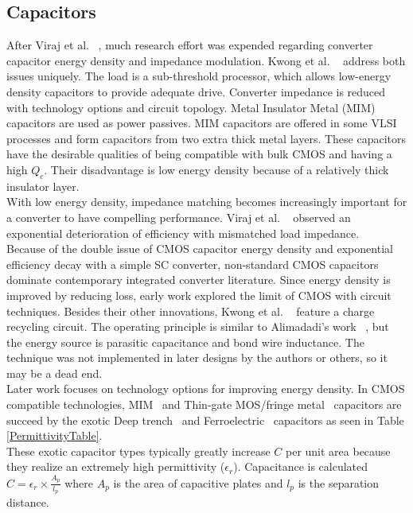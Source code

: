 \documentclass[letterpaper,twocolumn,10pt]{article}
\begin{document}
\subsection{Capacitors }After Viraj et al. ~\cite{Viraj2007}, much research effort was expended regarding converter capacitor energy density and impedance modulation. Kwong et al. ~\cite{Kwong2009} address both issues uniquely. The load is a sub-threshold processor, which allows low-energy density capacitors to provide adequate drive. Converter impedance is reduced with technology options and circuit topology. Metal Insulator Metal (MIM) capacitors are used as power passives. MIM capacitors are offered in some VLSI processes and form capacitors from two extra thick metal layers. These capacitors have the desirable qualities of being compatible with bulk CMOS and having a high $Q_c$. Their disadvantage is low energy density because of a relatively thick insulator layer.\\
With low energy density, impedance matching becomes increasingly important for a converter to have compelling performance. Viraj et al. ~\cite{Viraj2007} observed an exponential deterioration of efficiency with mismatched load impedance.\\
Because of the double issue of CMOS capacitor energy density and exponential efficiency decay with a simple SC converter, non-standard CMOS capacitors dominate contemporary integrated converter literature. Since energy density is improved by reducing loss, early work explored the limit of CMOS with circuit techniques. Besides their other innovations, Kwong et al. ~\cite{Kwong2009} feature a charge recycling circuit. The operating principle is similar to Alimadadi's work ~\cite{Alimadadi2008}, but the energy source is parasitic capacitance and bond wire inductance. The technique was not implemented in later designs by the authors or others, so it may be a dead end.\\
\indent Later work focuses on technology options for improving energy density. In CMOS compatible technologies, MIM~\cite{Kwong2009} and Thin-gate MOS/fringe metal~\cite{Pique2012} capacitors are succeed by the exotic Deep trench~\cite{Andersen2013} and Ferroelectric~\cite{Damak2013} capacitors as seen in Table \ref{PermittivityTable}.\\
These exotic capacitor types typically greatly increase $C$ per unit area because they realize an extremely high permittivity ($\epsilon_r$). Capacitance is calculated $C = \epsilon_r \times \frac{A_p}{l_p}$ where $A_p$ is the area of capacitive plates and $l_p$ is the separation distance. 
\end{document}

